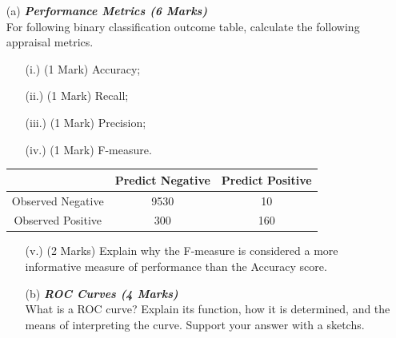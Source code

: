 \documentclass[a4paper,12pt]{article}
\begin{document}
\begin{itemize}
	\item[(a)] \textbf{\textit{Performance Metrics (6 Marks)}}\\
	For following binary classification outcome table, calculate the following appraisal metrics.
	\begin{itemize}	
		\item[(i.)] (1 Mark)	Accuracy;
		\item[(ii.)] (1 Mark)	Recall;
		\item[(iii.)] (1 Mark)	Precision;
		\item[(iv.)] (1 Mark)	F-measure.
	\end{itemize}	
	\vspace{-0.6cm}
		\begin{center}
		\begin{tabular}{|c|c|c|}
			\hline  & \phantom{spa}Predict Negative\phantom{spa} & \phantom{spa}Predict Positive\phantom{spa} \\ 
			\hline\phantom{spa} Observed Negative \phantom{spa}&	9530	&	10	\\ 
			\hline \phantom{spa}Observed Positive\phantom{spa} & 	300	&	160	\\ 
			\hline 
		\end{tabular} 
	\end{center}
	
	\begin{itemize}	
		\item[(v.)] (2 Marks) Explain why the F-measure is considered a more informative measure of performance than the Accuracy score.
	
	\end{itemize}
\bigskip
\begin{itemize}
	\item[(b)]  \textbf{\textit{ROC Curves	(4 Marks) }}\\
		What is a ROC curve? Explain its function, how it is determined, and the means of interpreting the curve. Support your answer with a sketchs.
\end{itemize}
\end{itemize}


\newpage



\newpage
\end{document}
